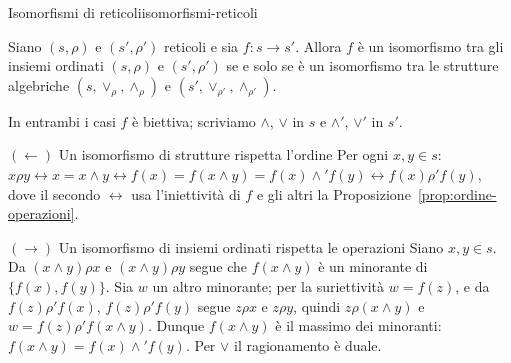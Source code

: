 \begin{concetto}
\begin{Teorema}{Isomorfismi di reticoli}{isomorfismi-reticoli}
    \begin{prerequisiti}
    \end{prerequisiti}
    Siano $(s, \rho)$ e $(s', \rho')$ reticoli e sia $f \colon s \to s'$. Allora $f$ è un isomorfismo tra gli insiemi ordinati $(s, \rho)$ e $(s', \rho')$ se e solo se è un
    isomorfismo tra le strutture algebriche $(s, \vee_\rho, \wedge_\rho)$ e $(s', \vee_{\rho'}, \wedge_{\rho'})$.
\end{Teorema}
\begin{dimostrazione}
    In entrambi i casi $f$ è biettiva; scriviamo $\wedge$, $\vee$ in $s$ e $\wedge'$, $\vee'$ in $s'$.
    \begin{caso}{$(\leftarrow)$ Un isomorfismo di strutture rispetta l'ordine}
        Per ogni $x, y \in s$: $x \rho y \leftrightarrow x = x \wedge y \leftrightarrow f(x) = f(x \wedge y) = f(x) \wedge' f(y) \leftrightarrow f(x) \rho' f(y)$, dove il secondo
        $\leftrightarrow$ usa l'iniettività di $f$ e gli altri la Proposizione~\ref{prop:ordine-operazioni}.
    \end{caso}
    \begin{caso}{$(\rightarrow)$ Un isomorfismo di insiemi ordinati rispetta le operazioni}
        Siano $x, y \in s$. Da $(x \wedge y) \rho x$ e $(x \wedge y) \rho y$ segue che $f(x \wedge y)$ è un minorante di $\{f(x), f(y)\}$. Sia $w$ un altro minorante; per la
        suriettività $w = f(z)$, e da $f(z) \rho' f(x)$, $f(z) \rho' f(y)$ segue $z \rho x$ e $z \rho y$, quindi $z \rho (x \wedge y)$ e $w = f(z) \rho' f(x \wedge y)$. Dunque
        $f(x \wedge y)$ è il massimo dei minoranti: $f(x \wedge y) = f(x) \wedge' f(y)$. Per $\vee$ il ragionamento è duale.
    \end{caso}
\end{dimostrazione}
\end{concetto}

